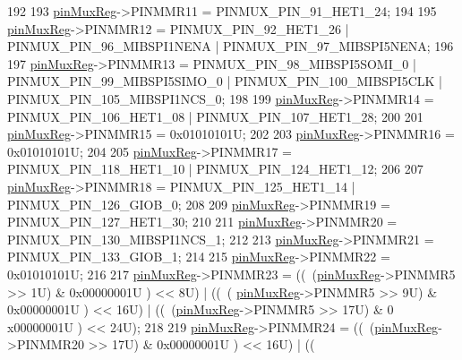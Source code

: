 \begin{DoxyCode}
192     
193     \mbox{\hyperlink{reg__pinmux_8h_a489be2306394971fc7586946f88d6380}{pinMuxReg}}->PINMMR11 =   PINMUX\_PIN\_91\_HET1\_24;
194     
195     \mbox{\hyperlink{reg__pinmux_8h_a489be2306394971fc7586946f88d6380}{pinMuxReg}}->PINMMR12 =   PINMUX\_PIN\_92\_HET1\_26 | PINMUX\_PIN\_96\_MIBSPI1NENA | 
      PINMUX\_PIN\_97\_MIBSPI5NENA;
196     
197     \mbox{\hyperlink{reg__pinmux_8h_a489be2306394971fc7586946f88d6380}{pinMuxReg}}->PINMMR13 =   PINMUX\_PIN\_98\_MIBSPI5SOMI\_0 | PINMUX\_PIN\_99\_MIBSPI5SIMO\_0 | 
      PINMUX\_PIN\_100\_MIBSPI5CLK | PINMUX\_PIN\_105\_MIBSPI1NCS\_0;
198     
199     \mbox{\hyperlink{reg__pinmux_8h_a489be2306394971fc7586946f88d6380}{pinMuxReg}}->PINMMR14 =   PINMUX\_PIN\_106\_HET1\_08 | PINMUX\_PIN\_107\_HET1\_28;
200     
201     \mbox{\hyperlink{reg__pinmux_8h_a489be2306394971fc7586946f88d6380}{pinMuxReg}}->PINMMR15 =   0x01010101U;
202     
203     \mbox{\hyperlink{reg__pinmux_8h_a489be2306394971fc7586946f88d6380}{pinMuxReg}}->PINMMR16 =   0x01010101U;
204     
205     \mbox{\hyperlink{reg__pinmux_8h_a489be2306394971fc7586946f88d6380}{pinMuxReg}}->PINMMR17 =   PINMUX\_PIN\_118\_HET1\_10 | PINMUX\_PIN\_124\_HET1\_12;
206     
207     \mbox{\hyperlink{reg__pinmux_8h_a489be2306394971fc7586946f88d6380}{pinMuxReg}}->PINMMR18 =   PINMUX\_PIN\_125\_HET1\_14 | PINMUX\_PIN\_126\_GIOB\_0;
208     
209     \mbox{\hyperlink{reg__pinmux_8h_a489be2306394971fc7586946f88d6380}{pinMuxReg}}->PINMMR19 =   PINMUX\_PIN\_127\_HET1\_30;
210     
211     \mbox{\hyperlink{reg__pinmux_8h_a489be2306394971fc7586946f88d6380}{pinMuxReg}}->PINMMR20 =   PINMUX\_PIN\_130\_MIBSPI1NCS\_1;
212     
213     \mbox{\hyperlink{reg__pinmux_8h_a489be2306394971fc7586946f88d6380}{pinMuxReg}}->PINMMR21 =   PINMUX\_PIN\_133\_GIOB\_1;
214     
215     \mbox{\hyperlink{reg__pinmux_8h_a489be2306394971fc7586946f88d6380}{pinMuxReg}}->PINMMR22 =   0x01010101U;
216     
217     \mbox{\hyperlink{reg__pinmux_8h_a489be2306394971fc7586946f88d6380}{pinMuxReg}}->PINMMR23 =   ((~(\mbox{\hyperlink{reg__pinmux_8h_a489be2306394971fc7586946f88d6380}{pinMuxReg}}->PINMMR5 >> 1U) & 0x00000001U ) << 8U) | ((~(
      \mbox{\hyperlink{reg__pinmux_8h_a489be2306394971fc7586946f88d6380}{pinMuxReg}}->PINMMR5 >> 9U) & 0x00000001U ) << 16U) | ((~(\mbox{\hyperlink{reg__pinmux_8h_a489be2306394971fc7586946f88d6380}{pinMuxReg}}->PINMMR5 >> 17U) & 0
      x00000001U ) << 24U);
218     
219     \mbox{\hyperlink{reg__pinmux_8h_a489be2306394971fc7586946f88d6380}{pinMuxReg}}->PINMMR24 =   ((~(\mbox{\hyperlink{reg__pinmux_8h_a489be2306394971fc7586946f88d6380}{pinMuxReg}}->PINMMR20 >> 17U) & 0x00000001U ) << 16U)  | ((

\end{DoxyCode}
